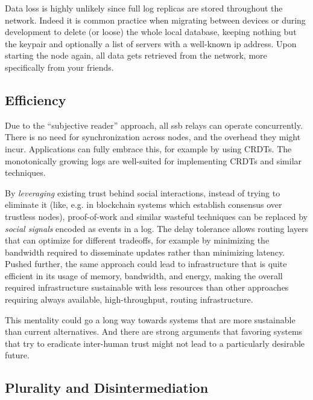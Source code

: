 \documentclass[10pt,sigconf,rewiew]{acmart}
\begin{document}
Data loss is highly unlikely since full log replicas are stored throughout the network. Indeed it is common practice when migrating between devices or during development to delete (or loose) the whole local database, keeping nothing but the keypair and optionally a list of servers with a well-known ip address. Upon starting the node again, all data gets retrieved from the network, more specifically from your friends.



\subsection{Efficiency}

Due to the ``subjective reader'' approach, all ssb relays can operate concurrently. There is no need for synchronization across nodes, and the overhead they might incur. Applications can fully embrace this, for example by using CRDTs. The monotonically growing logs are well-suited for implementing CRDTs and similar techniques.

By {\em leveraging} existing trust behind social interactions, instead of trying to eliminate it (like, e.g. in blockchain systems which establish consensus over trustless nodes), proof-of-work and similar wasteful techniques can be replaced by \textit{social signals} encoded as events in a log. The delay tolerance allows routing layers that can optimize for different tradeoffs, for example by minimizing the bandwidth required to disseminate updates rather than minimizing latency. Pushed further, the same approach could lead to infrastructure that is quite efficient in its usage of memory, bandwidth, and energy, making the overall required infrastructure sustainable with less resources than other approaches requiring always available, high-throughput, routing infrastructure.

This mentality could go a long way towards systems that are more sustainable than current alternatives. And there are strong arguments that favoring systems that try to eradicate inter-human trust might not lead to a particularly desirable future.

\subsection{Plurality and Disintermediation}
\end{document}
